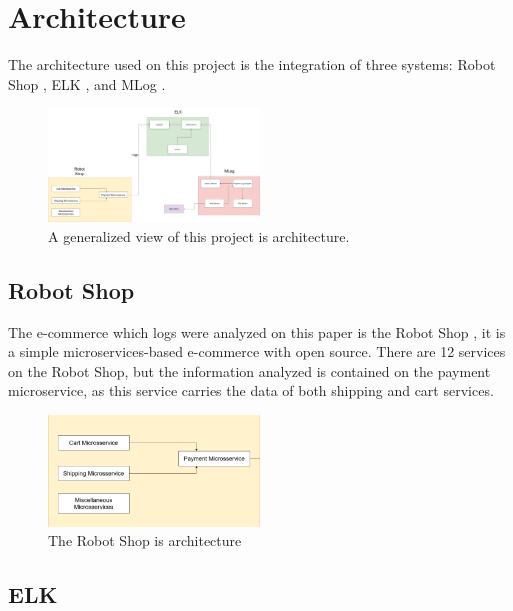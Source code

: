 \section{Architecture}

The architecture used on this project is the integration of three systems: Robot Shop \cite{robotshop}, ELK \cite{elk}, and MLog \cite{mlog}.

\begin{figure}[htbp]
\centering
\centerline{\includegraphics[width=0.5\textwidth]{Media/architecture.png}}
\caption{A generalized view of this project is architecture.}
\label{fig:architecture}
\end{figure}

\subsection{Robot Shop}

The e-commerce which logs were analyzed on this paper is the Robot Shop \cite{robotshop}, it is a simple microservices-based e-commerce with open source. There are 12 services on the Robot Shop, but the information analyzed is contained on the payment microservice, as this service carries the data of both shipping and cart services.

\begin{figure}[htbp]
\centering
\centerline{\includegraphics[width=0.5\textwidth]{Media/robot_shop.png}}
\caption{The Robot Shop is architecture}
\label{fig:architecture-robot-shop}
\end{figure}

\subsection{ELK}

